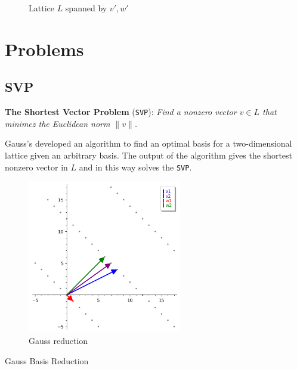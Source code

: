 \documentclass[a4paper,12pt]{report}
\begin{document}
\begin{figure}[!tbp]
\begin{minipage}[b]{0.50\textwidth}
        \caption{Lattice $L$ spanned by $v', w'$}
        \label{fig:lattice1}
    \end{minipage}
\end{figure}

\clearpage

\section{Problems}

\subsection{SVP}

\textbf{The Shortest Vector Problem} (\texttt{SVP}): \textit{Find a nonzero vector $v \in L$ that minimez the Euclidean norm $\lVert v \rVert$.}

Gauss's developed an algorithm to find an optimal basis for a two-dimensional lattice given an arbitrary basis. The output of the algorithm
gives the shortest nonzero vector in $L$ and in this way solves the \texttt{SVP}.

\begin{figure}[!b]
    \centering
    \includegraphics[width=0.6\textwidth]{./img/gauss_svp.png}
    \caption{Gauss reduction}
    \label{fig:gauss_svp}
\end{figure}

\begin{algorithm}[H]
    \vspace*{5px}
    \caption{Gauss Basis Reduction}
\end{algorithm}
\end{document}
